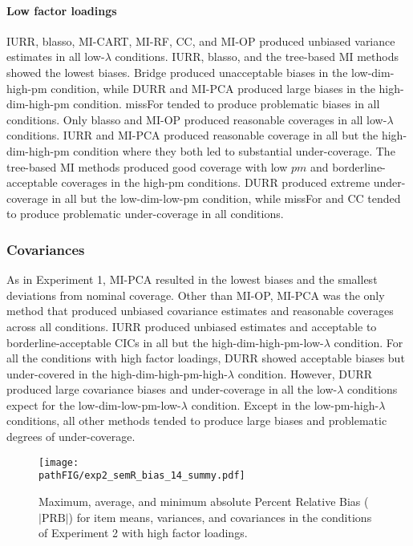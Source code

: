 \paragraph{Low factor loadings}
IURR, blasso, MI-CART, MI-RF, CC, and MI-OP produced unbiased variance estimates in all low-$\lambda$ conditions. IURR, blasso, and the tree-based MI methods showed the lowest biases. Bridge produced unacceptable biases in the low-dim-high-pm condition, while DURR and MI-PCA produced large biases in the high-dim-high-pm condition. missFor tended to produce problematic biases in all conditions. Only blasso and MI-OP produced reasonable coverages in all low-$\lambda$ conditions. IURR and MI-PCA produced reasonable coverage in all but the high-dim-high-pm condition where they both led to substantial under-coverage. The tree-based MI methods produced good coverage with low $pm$ and borderline-acceptable coverages in the high-pm conditions. DURR produced extreme under-coverage in all but the low-dim-low-pm condition, while missFor and CC tended to produce problematic under-coverage in all conditions.

	\subsubsection{Covariances}
	
	As in Experiment 1, MI-PCA resulted in the lowest biases and the smallest deviations from nominal coverage. Other than MI-OP, MI-PCA was the only method that produced unbiased covariance estimates and reasonable coverages across all conditions. IURR produced unbiased estimates and acceptable to borderline-acceptable CICs in all but the high-dim-high-pm-low-$\lambda$ condition.
	For all the conditions with high factor loadings, DURR showed acceptable biases but under-covered in the high-dim-high-pm-high-$\lambda$ condition.
	However, DURR produced large covariance biases and under-coverage in all the low-$\lambda$ conditions expect for the low-dim-low-pm-low-$\lambda$ condition.
	Except in the low-pm-high-$\lambda$ conditions, all other methods tended to produce large biases and problematic degrees of under-coverage.

\begin{figure}
	\texttt{[image: \\pathFIG/exp2\_semR\_bias\_14\_summy.pdf]}
\caption{
	Maximum, average, and minimum absolute Percent Relative Bias ($|\text{PRB}|$) for item means, variances, 
	and covariances in the conditions of Experiment 2 with high factor loadings.
}
\label{fig:exp2bias14}
\end{figure}

